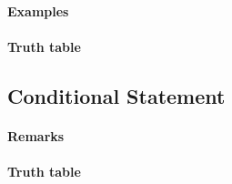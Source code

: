 \documentclass[]{book}
\let\oldparagraph\paragraph
\renewcommand{\paragraph}[1]{\oldparagraph{#1}\mbox{}}
\theoremstyle{definition}
\theoremstyle{definition}
\theoremstyle{definition}
\theoremstyle{remark}
\begin{document}
\hypertarget{examples-4}{%
\paragraph{Examples}\label{examples-4}}

\hypertarget{truth-table-1}{%
\paragraph{Truth table}\label{truth-table-1}}

\hypertarget{conditional-statement}{%
\subsection*{Conditional Statement}\label{conditional-statement}}

\hypertarget{remarks-7}{%
\paragraph{Remarks}\label{remarks-7}}

\hypertarget{truth-table-2}{%
\paragraph{Truth table}\label{truth-table-2}}


\end{document}
